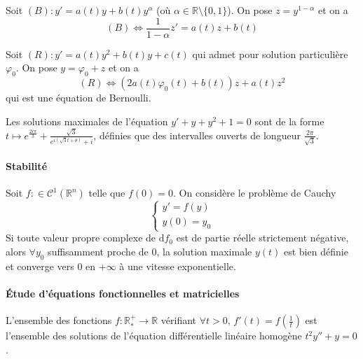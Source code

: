 
	\begin{application}
		Soit $(B) : y' = a(t) y + b(t) y^\alpha$ (où $\alpha \in \mathbb{R} \setminus \{0,1\}$). On pose $z=y^{1-\alpha}$ et on a
		\[ (B) \iff \frac{1}{1-\alpha} z' = a(t)z + b(t) \]
	\end{application}

	\begin{corollary}
		Soit $(R) : y' = a(t) y^2 + b(t) y + c(t)$ qui admet pour solution particulière $\varphi_0$. On pose $y = \varphi_0 + z$ et on a
		\[ (R) \iff (2a(t) \varphi_0(t) + b(t))z + a(t)z^2 \]
		qui est une équation de Bernoulli.
	\end{corollary}

	\begin{example}
		Les solutions maximales de l'équation $y' + y + y^2 + 1 = 0$ sont de la forme $t \mapsto e^{\frac{2i\pi}{3}} + \frac{\sqrt{3}}{e^{i (\sqrt{3}t+\theta)} + i}$, définies que des intervalles ouverts de longueur $\frac{2 \pi}{\sqrt{3}}$.
	\end{example}

	\paragraph{Stabilité}


	\begin{application}
		Soit $f : \in \mathcal{C}^1(\mathbb{R}^n)$ telle que $f(0) = 0$. On considère le problème de Cauchy
		\[ \begin{cases} y'=f(y) \\ y(0) = y_0 \end{cases} \]
		Si toute valeur propre complexe de $\mathrm{d}f_0$ est de partie réelle strictement négative, alors $\forall y_0$ suffisamment proche de $0$, la solution maximale $y(t)$ est bien définie et converge vers $0$ en $+ \infty$ à une vitesse exponentielle.
	\end{application}

	\paragraph{Étude d'équations fonctionnelles et matricielles}


	\begin{application}
		L'ensemble des fonctions $f : \mathbb{R}^+_* \rightarrow \mathbb{R}$ vérifiant $\forall t > 0, \, f'(t) = f \left( \frac{1}{t} \right)$ est l'ensemble des solutions de l'équation différentielle linéaire homogène $t^2 y'' + y = 0$.
	\end{application}

